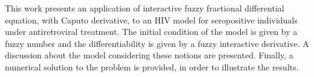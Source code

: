 

This work presents an application of interactive fuzzy fractional differential equation, with Caputo derivative, to an HIV model for seropositive individuals under antiretroviral treatment. The initial condition of the model is given by a fuzzy number and the differentiability is given by a fuzzy interactive derivative. A discussion about the model considering these notions are presented. Finally, a numerical solution to the problem is provided, in order to illustrate the results.



